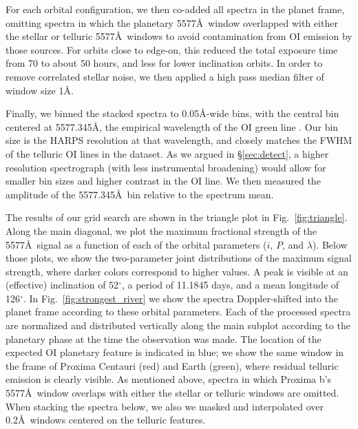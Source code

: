 \documentclass{emulateapj}
\begin{document}
For each orbital configuration, we then co-added all spectra in the planet frame, omitting spectra in which the planetary 5577\AA\ window overlapped with either the stellar or telluric 5577\AA\ windows to avoid contamination from OI emission by those sources. For orbits close to edge-on, this reduced the total exposure time from 70 to about 50 hours, and less for lower inclination orbits. In order to remove correlated stellar noise, we then applied a high pass median filter of window size 1\AA.

Finally, we binned the stacked spectra to 0.05\AA-wide bins, with the central bin centered at 5577.345\AA, the empirical wavelength of the OI green line \citep{CabannesDufay1955,Chamberlain1961}. Our bin size is the HARPS resolution at that wavelength, and closely matches the FWHM of the telluric OI lines in the dataset. As we argued in \S\ref{sec:detect}, a higher resolution spectrograph (with less instrumental broadening) would allow for smaller bin sizes and higher contrast in the OI line. We then measured the amplitude of the 5577.345\AA\ bin relative to the spectrum mean.

The results of our grid search are shown in the triangle plot in Fig.~\ref{fig:triangle}. Along the main diagonal, we plot the maximum fractional strength of the 5577\AA\ signal as a function of each of the orbital parameters ($i$, $P$, and $\lambda$). Below those plots, we show the two-parameter joint distributions of the maximum signal strength, where darker colors correspond to higher values. A peak is visible at an (effective) inclination of 52$^\circ$, a period of 11.1845 days, and a mean longitude of 126$^\circ$. In Fig.~\ref{fig:strongest_river} we show the spectra Doppler-shifted into the planet frame according to these orbital parameters. Each of the processed spectra are normalized and distributed vertically along the main subplot according to the planetary phase at the time the observation was made. The location of the expected OI planetary feature is indicated in blue; we show the same window in the frame of Proxima Centauri (red) and Earth (green), where residual telluric emission is clearly visible. As mentioned above, spectra in which Proxima b's 5577\AA\ window overlaps with either the stellar or telluric windows are omitted. When stacking the spectra below, we also we masked and interpolated over 0.2\AA\ windows centered on the telluric features.
\end{document}

